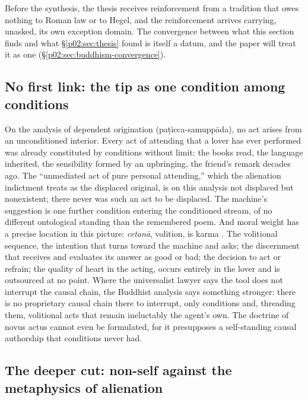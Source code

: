 \documentclass[11pt,a4paper]{article}
\begin{document}
Before the synthesis, the thesis receives reinforcement from a tradition that owes nothing to Roman law or to Hegel, and the reinforcement arrives carrying, unasked, its own exception domain. The convergence between what this section finds and what \S\ref{p02:sec:thesis} found is itself a datum, and the paper will treat it as one (\S\ref{p02:sec:buddhism-convergence}).

\subsection{No first link: the tip as one condition among conditions}
\label{p02:sec:buddhism-conditions}

On the analysis of dependent origination (pa\d{t}icca-samupp\=ada), no act arises from an unconditioned interior. Every act of attending that a lover has ever performed was already constituted by conditions without limit: the books read, the language inherited, the sensibility formed by an upbringing, the friend's remark decades ago. The ``unmediated act of pure personal attending,'' which the alienation indictment treats as the displaced original, is on this analysis not displaced but nonexistent; there never was such an act to be displaced. The machine's suggestion is one further condition entering the conditioned stream, of no different ontological standing than the remembered poem. And moral weight has a precise location in this picture: \emph{cetan\=a}, volition, is karma \parencite[AN 6.63]{bodhi2012numerical}. The volitional sequence, the intention that turns toward the machine and asks; the discernment that receives and evaluates its answer as good or bad; the decision to act or refrain; the quality of heart in the acting, occurs entirely in the lover and is outsourced at no point. Where the universalist lawyer says the tool does not interrupt the causal chain, the Buddhist analysis says something stronger: there is no proprietary causal chain there to interrupt, only conditions and, threading them, volitional acts that remain ineluctably the agent's own. The doctrine of novus actus cannot even be formulated, for it presupposes a self-standing causal authorship that conditions never had.

\subsection{The deeper cut: non-self against the metaphysics of alienation}
\label{p02:sec:buddhism-anatta}
\end{document}
